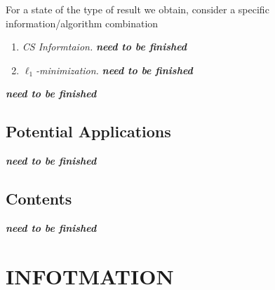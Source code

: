 For a state of the type of result we obtain, consider a specific information/algorithm combination
\begin{enumerate}
    \item \emph{CS Informtaion.} \emph{\textbf{\textcolor[rgb]{1,0,0}{need to be finished}}}
    \item \emph{$\ell_1$-minimization.} \emph{\textbf{\textcolor[rgb]{1,0,0}{need to be finished}}}
\end{enumerate}
\emph{\textbf{\textcolor[rgb]{1,0,0}{need to be finished}}}

\subsection{Potential Applications}
\emph{\textbf{\textcolor[rgb]{1,0,0}{need to be finished}}}
\subsection{Contents}
\emph{\textbf{\textcolor[rgb]{1,0,0}{need to be finished}}}
\section{INFOTMATION}

